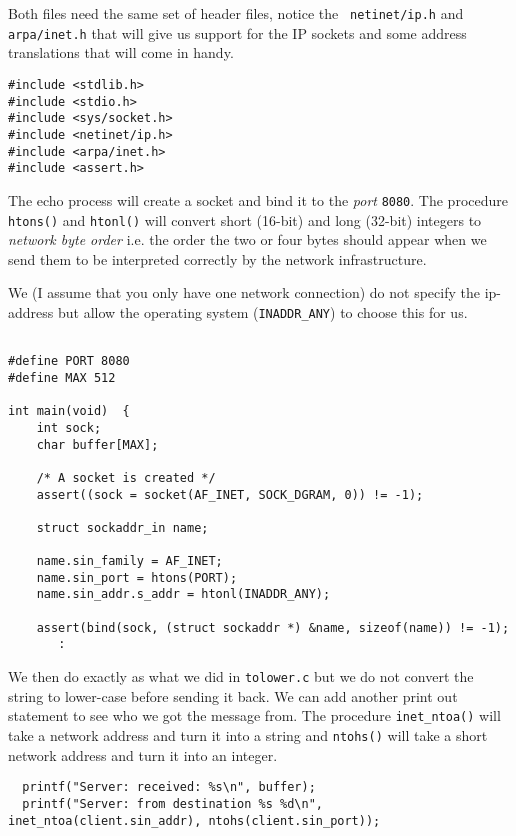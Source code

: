 \documentclass[a4paper,11pt]{article}
\begin{document}
Both files need the same set of header files, notice the {\tt
  netinet/ip.h} and {\tt arpa/inet.h} that will give us support for the
IP sockets and some address translations that will come in handy.

\begin{lstlisting}
#include <stdlib.h>
#include <stdio.h>
#include <sys/socket.h>
#include <netinet/ip.h>
#include <arpa/inet.h>
#include <assert.h>
\end{lstlisting}

The echo process will create a socket and bind it to the {\em port}
{\tt 8080}. The procedure {\tt htons()} and {\tt htonl()} will convert
short (16-bit) and long (32-bit) integers to {\em network byte order}
i.e. the order the two or four bytes should appear when we send them to
be interpreted correctly by the network infrastructure. 

We (I assume that you only have one network connection) do not specify
the ip-address but allow the operating system ({\tt INADDR\_ANY}) to
choose this for us.

\begin{lstlisting}

#define PORT 8080
#define MAX 512

int main(void)  {
    int sock;
    char buffer[MAX];

    /* A socket is created */
    assert((sock = socket(AF_INET, SOCK_DGRAM, 0)) != -1);

    struct sockaddr_in name;
    
    name.sin_family = AF_INET;
    name.sin_port = htons(PORT);
    name.sin_addr.s_addr = htonl(INADDR_ANY);

    assert(bind(sock, (struct sockaddr *) &name, sizeof(name)) != -1);
       :  
\end{lstlisting}

We then do exactly as what we did in {\tt tolower.c} but we do not
convert the string to lower-case before sending it back.  We can add
another print out statement to see who we got the message from. The
procedure {\tt inet\_ntoa()} will take a network address and turn it
into a string and {\tt ntohs()} will take a short network address and
turn it into an integer.

\begin{lstlisting}
  printf("Server: received: %s\n", buffer);
  printf("Server: from destination %s %d\n", inet_ntoa(client.sin_addr), ntohs(client.sin_port));
\end{lstlisting}
\end{document}
